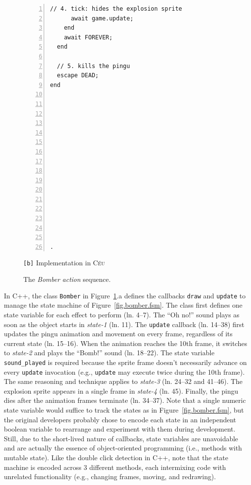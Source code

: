 \documentclass{vgtc}                          %
\newcommand{\CEU}{\textsc{C\'{e}u}\xspace}
\newcommand{\code}[1] {{\small{\texttt{#1}}}}
\newcommand{\bx}{\code{[b]}\xspace}
\begin{document}
\begin{figure}[!t]
\begin{minipage}[t]{0.50\linewidth}
\begin{lstlisting}[numbers=left,xleftmargin=3em]
      // 4. tick: hides the explosion sprite
      await game.update;
    end
    await FOREVER;
  end

  // 5. kills the pingu
  escape DEAD;
end
















.
\end{lstlisting}
\centering\small{\bx Implementation in \CEU}
\end{minipage}
\caption{ The \emph{Bomber action} sequence.
\label{lst.bomber}
}
\end{figure}

In C++, the class \code{Bomber} in Figure~\ref{lst.bomber}.a defines the
callbacks \code{draw} and \code{update} to manage the state machine of
Figure~\ref{fig.bomber.fsm}.
%
The class first defines one state variable for each effect to perform
(ln. 4--7).
The ``Oh no!'' sound plays as soon as the object starts in \emph{state-1} 
(ln. 11).
The \code{update} callback (ln. 14--38) first updates the pingu animation and
movement on every frame, regardless of its current state (ln. 15--16).
When the animation reaches the 10th frame, it switches to \emph{state-2} and
plays the ``Bomb!'' sound (ln. 18--22).
The state variable \code{sound\_played} is required because the sprite frame
doesn't necessarily advance on every \code{update} invocation (e.g.,
\code{update} may execute twice during the 10th frame).
The same reasoning and technique applies to \emph{state-3} (ln. 24--32 and
41--46).
The explosion sprite appears in a single frame in \emph{state-4} (ln. 45).
Finally, the pingu dies after the animation frames terminate (ln. 34--37).
%
Note that a single numeric state variable would suffice to track the states as
in Figure~\ref{fig.bomber.fsm}, but the original developers probably chose to
encode each state in an independent boolean 
variable to rearrange and experiment with them during development.
Still, due to the short-lived nature of callbacks, state variables are 
unavoidable and are actually the essence of object-oriented programming
(i.e., methods with mutable state).
%
Like the double click detection in C++, note that the state machine is encoded
across 3 different methods, each intermixing code with unrelated functionality
(e.g., changing frames, moving, and redrawing).
\end{document}
